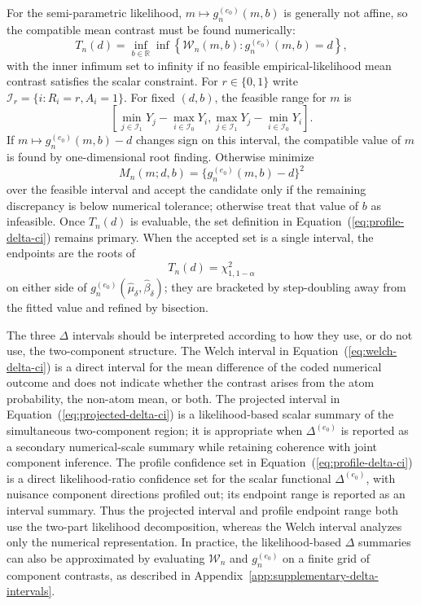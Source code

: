 \documentclass[11pt]{article}
\begin{document}
For the semi-parametric likelihood, $m\mapsto g_n^{(e_0)}(m,b)$ is generally not affine, so the compatible mean contrast must be found numerically:
\[
  T_n(d)
  =
  \inf_{b\in\mathbb{R}}
  \inf\left\{
    \mathcal{W}_n(m,b):
    g_n^{(e_0)}(m,b)=d
  \right\},
\]
with the inner infimum set to infinity if no feasible empirical-likelihood mean contrast satisfies the scalar constraint. For $r\in\{0,1\}$ write $\mathcal{I}_r=\{i:R_i=r,A_i=1\}$. For fixed $(d,b)$, the feasible range for $m$ is
\[
  \left[
    \min_{j\in\mathcal{I}_1}Y_j-
    \max_{i\in\mathcal{I}_0}Y_i,
    \max_{j\in\mathcal{I}_1}Y_j-
    \min_{i\in\mathcal{I}_0}Y_i
  \right].
\]
If $m\mapsto g_n^{(e_0)}(m,b)-d$ changes sign on this interval, the compatible value of $m$ is found by one-dimensional root finding. Otherwise minimize
\[
  M_n(m;d,b)=\{g_n^{(e_0)}(m,b)-d\}^2
\]
over the feasible interval and accept the candidate only if the remaining discrepancy is below numerical tolerance; otherwise treat that value of $b$ as infeasible. Once $T_n(d)$ is evaluable, the set definition in Equation~(\ref{eq:profile-delta-ci}) remains primary. When the accepted set is a single interval, the endpoints are the roots of
\[
  T_n(d)=\chi^2_{1,1-\alpha}
\]
on either side of $g_n^{(e_0)}(\widehat{\mu}_\delta,\widehat{\beta}_\delta)$; they are bracketed by step-doubling away from the fitted value and refined by bisection.

The three $\Delta$ intervals should be interpreted according to how they use, or do not use, the two-component structure. The Welch interval in Equation~(\ref{eq:welch-delta-ci}) is a direct interval for the mean difference of the coded numerical outcome and does not indicate whether the contrast arises from the atom probability, the non-atom mean, or both. The projected interval in Equation~(\ref{eq:projected-delta-ci}) is a likelihood-based scalar summary of the simultaneous two-component region; it is appropriate when $\Delta^{(e_0)}$ is reported as a secondary numerical-scale summary while retaining coherence with joint component inference. The profile confidence set in Equation~(\ref{eq:profile-delta-ci}) is a direct likelihood-ratio confidence set for the scalar functional $\Delta^{(e_0)}$, with nuisance component directions profiled out; its endpoint range is reported as an interval summary. Thus the projected interval and profile endpoint range both use the two-part likelihood decomposition, whereas the Welch interval analyzes only the numerical representation. In practice, the likelihood-based $\Delta$ summaries can also be approximated by evaluating $\mathcal{W}_n$ and $g_n^{(e_0)}$ on a finite grid of component contrasts, as described in Appendix~\ref{app:supplementary-delta-intervals}.
\end{document}
